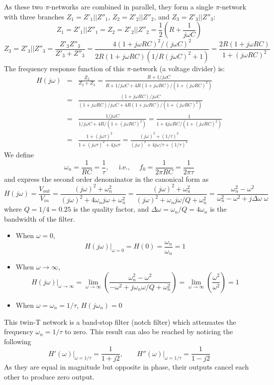 \begin{itemize}
\end{itemize}

As these two $\pi$-networks are combined in parallel, they form a single
$\pi$-network with three branches $Z_1=Z'_1||Z''_1$, $Z_2=Z'_2||Z''_2$, 
and $Z_3=Z'_3||Z''_3$:
\[
Z_1=Z'_1||Z''_1=Z_2=Z'_2||Z''_2=\frac{1}{2}\left(R+\frac{1}{j\omega C}\right)
\]
\[
  Z_3=Z'_3||Z''_3=\frac{Z'_3 Z''_3}{Z'_3+Z''_3}
  =\frac{4(1+j\omega RC)^2/(j\omega C)^2}{2R(1+j\omega RC)(1/R(j\omega C)^2+1)}
  =\frac{2R(1+j\omega RC)}{1+(j\omega RC)^2}
\]
The frequency response function of this $\pi$-network (a voltage divider) is:
\begin{eqnarray}
  H(j\omega)&=&\frac{Z_2}{Z_2+Z_3}=\frac{R+1/j\omega C}
  {R+1/j\omega C+4R(1+j\omega RC)/(1+(j\omega RC)^2)}
  \nonumber \\
  &=&\frac{(1+j\omega RC)/j\omega C}{(1+j\omega RC)/j\omega C+4R(1+j\omega RC)/(1+(j\omega RC)^2)}
  \nonumber \\
  &=&\frac{1/j\omega C}{1/j\omega C+4R/(1+(j\omega RC)^2)}
  =\frac{1}{1+4j\omega RC/(1+(j\omega RC)^2)}
  \nonumber \\
  &=&\frac{1+(j\omega\tau)^2}{1+(j\omega\tau)^2+4j\omega\tau}
  =\frac{(j\omega)^2+(1/\tau)^2}{(j\omega)^2+4j\omega/\tau+(1/\tau)^2}
  \nonumber
\end{eqnarray}
We define
\[
\omega_n=\frac{1}{RC}=\frac{1}{\tau},\;\;\;\;\;\mbox{i.e.,}\;\;\;\;\;
f_0=\frac{1}{2\pi RC}=\frac{1}{2\pi\tau}
\]
and express the second order denominator in the canonical form as
\[
H(j\omega)=\frac{V_{out}}{V_{in}}=\frac{(j\omega)^2+\omega_n^2}{(j\omega)^2+4\omega_nj\omega+\omega_n^2}
=\frac{(j\omega)^2+\omega_n^2}{(j\omega)^2+\omega_nj\omega/Q+\omega_n^2}
=\frac{\omega_n^2-\omega^2}{\omega_n^2-\omega^2+j\Delta\omega\;\omega}
\]
where $Q=1/4=0.25$ is the quality factor, and 
$\Delta\omega=\omega_n/Q=4\omega_n$ is the bandwidth of the filter.

\begin{itemize}
\item When $\omega=0$, 
  \[
  H(j\omega)\big|_{\omega=0}=H(0)=\frac{\omega_n}{\omega_n}=1
  \]
\item When $\omega\rightarrow \infty$, 
  \[
  H(j\omega)\big|_{\omega\rightarrow\infty}=\lim\limits_{\omega\rightarrow\infty}
  \left( \frac{\omega_n^2-\omega^2}{-\omega^2+j\omega_n\omega/Q+\omega_n^2}
  \right)
  =\lim\limits_{\omega\rightarrow\infty}\left(\frac{\omega^2}{\omega^2}\right)=1
  \]
\item When $\omega=\omega_n=1/\tau$, $H(j\omega_n)=0$
\end{itemize}
This twin-T network is a band-stop filter (notch filter) which attenuates 
the frequency $\omega_n=1/\tau$ to zero. This result can also be reached
by noticing the following
\[
H'(\omega)\big|_{\omega=1/\tau}=\frac{1}{1+j2},\;\;\;\;\;\;\;
H''(\omega)\big|_{\omega=1/\tau}=\frac{1}{1-j2}
\]
As they are equal in magnitude but opposite in phase, their outputs 
cancel each other to produce zero output.

